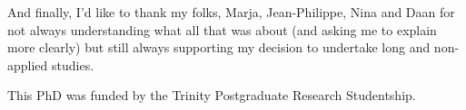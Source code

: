 And finally, I'd like to thank my folks, Marja, Jean-Philippe, Nina and Daan for not always understanding what all that was about (and asking me to explain more clearly) but still always supporting my decision to undertake long and non-applied studies.

This PhD was funded by the Trinity Postgraduate Research Studentship.%



